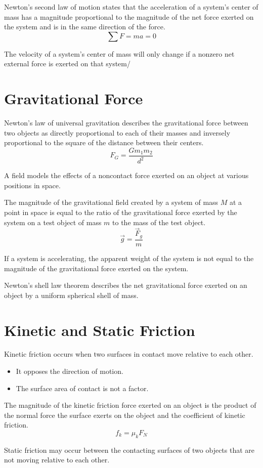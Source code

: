 \documentclass[../mech.tex]{subfiles}
\begin{document}
Newton's second law of motion states that the acceleration of a system's center of mass has a magnitude proportional to the magnitude of the net force exerted on the system and is in the same direction of the force.
\[ \sum F = ma =0 \]

The velocity of a system's center of mass will only change if a nonzero net external force is exerted on that system/

\section{Gravitational Force}
Newton's law of universal gravitation describes the gravitational force between two objects as directly proportional to each of their masses and inversely proportional to the square of the distance between their centers.
\[ F_G = \frac{Gm_1m_2}{d^2} \]

A field models the effects of a noncontact force exerted on an object at various positions in space.

The magnitude of the gravitational field created by a system of mass $M$ at a point in space is equal to the ratio of the gravitational force exerted by the system on a test object of mass $m$ to the mass of the test object. 
\[ \vec{g}=\frac{\vec{F}_g}{m} \]

If a system is accelerating, the apparent weight of the system is not equal to the magnitude of the gravitational force exerted on the system.

Newton's shell law theorem describes the net gravitational force exerted on an object by a uniform spherical shell of mass.

\section{Kinetic and Static Friction}
Kinetic friction occurs when two surfaces in contact move relative to each other.
\begin{itemize}
    \item It opposes the direction of motion.
    \item The surface area of contact is not a factor.
\end{itemize}

The magnitude of the kinetic friction force exerted on an object is the product of the normal force the surface exerts on the object and the coefficient of kinetic friction.
\[ f_k = \mu_k F_N \]

Static friction may occur between the contacting surfaces of two objects that are not moving relative to each other.
\end{document}

